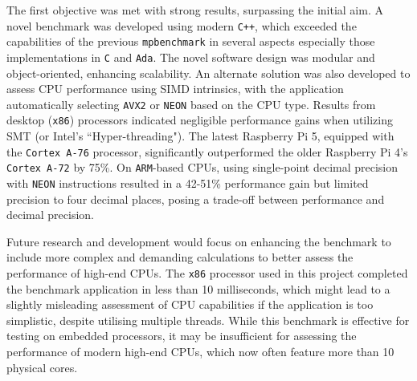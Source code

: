 

The first objective was met with strong results, surpassing the initial aim. A novel benchmark was developed using modern \texttt{C++}, which exceeded the capabilities of the previous \texttt{mpbenchmark}\cite{mpbenchmark_paper} in several aspects especially those implementations in \texttt{C} and \texttt{Ada}. The novel software design was modular and object-oriented, enhancing scalability. An alternate solution was also developed to assess CPU performance using SIMD intrinsics, with the application automatically selecting \texttt{AVX2} or \texttt{NEON} based on the CPU type. Results from desktop (\texttt{x86}) processors indicated negligible performance gains when utilizing SMT (or Intel's ``Hyper-threading"). The latest Raspberry Pi 5, equipped with the \texttt{Cortex A-76} processor, significantly outperformed the older Raspberry Pi 4's \texttt{Cortex A-72} by 75\%. On \texttt{ARM}-based CPUs, using single-point decimal precision with \texttt{NEON} instructions resulted in a 42-51\% performance gain but limited precision to four decimal places, posing a trade-off between performance and decimal precision.

Future research and development would focus on enhancing the benchmark to include more complex and demanding calculations to better assess the performance of high-end CPUs. The \texttt{x86} processor used in this project completed the benchmark application in less than 10 milliseconds, which might lead to a slightly misleading assessment of CPU capabilities if the application is too simplistic, despite utilising multiple threads. While this benchmark is effective for testing on embedded processors, it may be insufficient for assessing the performance of modern high-end CPUs, which now often feature more than 10 physical cores.

